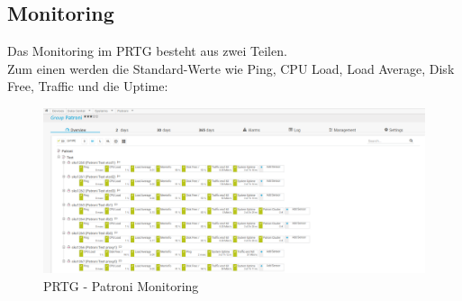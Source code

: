 
\begin{flushleft}
    \section{Monitoring}
    Das Monitoring im \Gls{PRTG} besteht aus zwei Teilen.\\
    Zum einen werden die Standard-Werte wie Ping, CPU Load, Load Average, Disk Free, Traffic und die Uptime:
    \begin{figure}[H]
        \centering
        \includegraphics[width=1\linewidth]{source/implementation/construction_implementation/monitoring/prtg_patroni}
        \caption{\Gls{PRTG} - Patroni Monitoring}
        \label{fig:prtg_patroni}
    \end{figure}
\end{flushleft}
